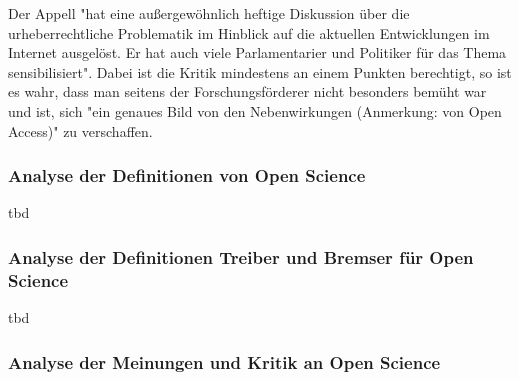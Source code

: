 Der Appell "hat eine außergewöhnlich heftige Diskussion über die urheberrechtliche Problematik im Hinblick auf die aktuellen Entwicklungen im Internet ausgelöst. Er hat auch viele Parlamentarier und Politiker für das Thema sensibilisiert"\cite{WD_bundestag_2009}. Dabei ist die Kritik mindestens an einem Punkten berechtigt, so ist es wahr, dass man seitens der Forschungsförderer nicht besonders bemüht war und ist, sich "ein genaues Bild von den Nebenwirkungen (Anmerkung: von Open Access)" \cite{Reuss_2009} zu verschaffen.



\subsubsection{Analyse der Definitionen von Open Science} 
tbd

\subsubsection{Analyse der Definitionen Treiber und Bremser für Open Science} 
tbd

\subsubsection{Analyse der Meinungen und Kritik an Open Science}

